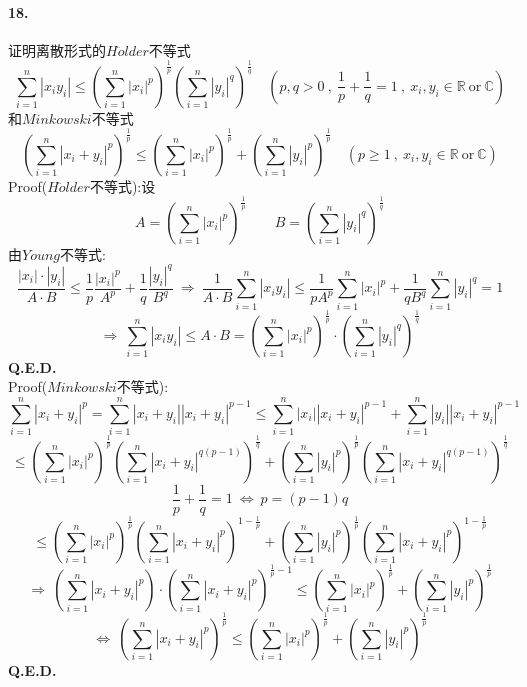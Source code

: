 \paragraph*{18.}证明离散形式的$H\ddot{o}lder$不等式
\[\sum_{i=1}^n|x_iy_i| \leq \left(\sum_{i=1}^n|x_i|^p\right)^{\frac{1}{p}}\left(\sum_{i=1}^n|y_i|^q\right)^{\frac{1}{q}} \quad (p,q>0 \ , \ \frac{1}{p}+\frac{1}{q}=1 \ , \ x_i,y_i \in \mathbb{R} \ \text{or} \ \mathbb{C})\]
和$Minkowski$不等式
\[\left(\sum_{i=1}^n|x_i+y_i|^p\right)^{\frac{1}{p}} \leq \left(\sum_{i=1}^n|x_i|^p\right)^{\frac{1}{p}}+\left(\sum_{i=1}^n|y_i|^p\right)^{\frac{1}{p}} \quad (p \geq 1 \ , \ x_i,y_i \in \mathbb{R} \ \text{or} \ \mathbb{C})\]
Proof($H\ddot{o}lder$不等式):设
\[A=\left(\sum_{i=1}^n|x_i|^p\right)^{\frac{1}{p}} \qquad B=\left(\sum_{i=1}^n|y_i|^q\right)^{\frac{1}{q}}\]
由$Young$不等式:
\[\frac{|x_i| \cdot |y_i|}{A \cdot B} \leq \frac{1}{p}\frac{|x_i|^p}{A^p}+\frac{1}{q}\frac{|y_i|^q}{B^q} \ \Rightarrow \ \frac{1}{A \cdot B}\sum_{i=1}^n|x_iy_i| \leq \frac{1}{pA^p}\sum_{i=1}^n|x_i|^p+\frac{1}{qB^q}\sum_{i=1}^n|y_i|^q=1\]
\[\Rightarrow \ \sum_{i=1}^n|x_iy_i| \leq A \cdot B=\left(\sum_{i=1}^n|x_i|^p\right)^{\frac{1}{p}} \cdot \left(\sum_{i=1}^n|y_i|^q\right)^{\frac{1}{q}}\]
\textbf{Q.E.D.}\\
Proof($Minkowski$不等式):
\[\sum_{i=1}^n|x_i+y_i|^p=\sum_{i=1}^n|x_i+y_i||x_i+y_i|^{p-1} \leq \sum_{i=1}^n|x_i||x_i+y_i|^{p-1}+\sum_{i=1}^n|y_i||x_i+y_i|^{p-1}\]
\[\leq \left(\sum_{i=1}^n|x_i|^p\right)^{\frac{1}{p}}\left(\sum_{i=1}^n|x_i+y_i|^{q(p-1)}\right)^{\frac{1}{q}}+\left(\sum_{i=1}^n|y_i|^p\right)^{\frac{1}{p}}\left(\sum_{i=1}^n|x_i+y_i|^{q(p-1)}\right)^{\frac{1}{q}}\]
\[\frac{1}{p}+\frac{1}{q}=1 \ \Leftrightarrow \ p=(p-1)q\]
\[\leq \left(\sum_{i=1}^n|x_i|^p\right)^{\frac{1}{p}}\left(\sum_{i=1}^n|x_i+y_i|^{p}\right)^{1-\frac{1}{p}}+\left(\sum_{i=1}^n|y_i|^p\right)^{\frac{1}{p}}\left(\sum_{i=1}^n|x_i+y_i|^{p}\right)^{1-\frac{1}{p}}\]
\[\Rightarrow \ \left(\sum_{i=1}^n|x_i+y_i|^p\right) \cdot \left(\sum_{i=1}^n|x_i+y_i|^{p}\right)^{\frac{1}{p}-1} \leq \left(\sum_{i=1}^n|x_i|^p\right)^{\frac{1}{p}}+\left(\sum_{i=1}^n|y_i|^p\right)^{\frac{1}{p}}\]
\[\Leftrightarrow \ \left(\sum_{i=1}^n|x_i+y_i|^{p}\right)^{\frac{1}{p}} \leq \left(\sum_{i=1}^n|x_i|^p\right)^{\frac{1}{p}}+\left(\sum_{i=1}^n|y_i|^p\right)^{\frac{1}{p}}\]
\textbf{Q.E.D.}

